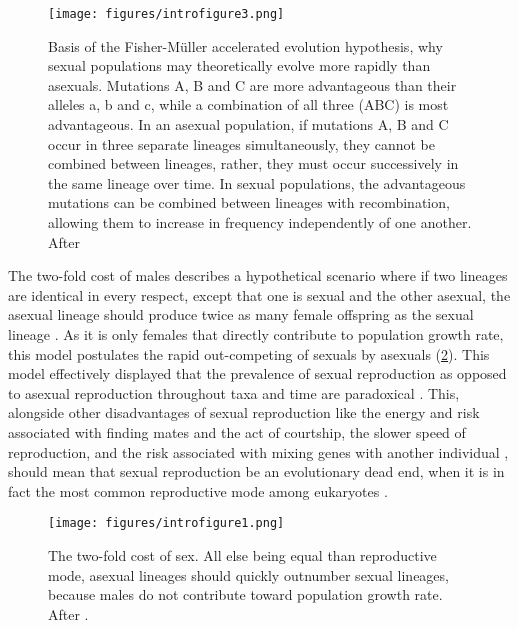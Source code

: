 \begin{figure}
\centering
{}
{\texttt{[image: figures/introfigure3.png]}}
\caption[Basis of the Fisher-M\"uller accelerated evolution hypothesis]{Basis of the Fisher-M\"uller accelerated evolution hypothesis, why sexual populations may theoretically evolve more rapidly than asexuals. Mutations A, B and C are more advantageous than their alleles a, b and c, while a combination of all three (ABC) is most advantageous. In an asexual population, if mutations A, B and C occur in three separate lineages simultaneously, they cannot be combined between lineages, rather, they must occur successively in the same lineage over time. In sexual populations, the advantageous mutations can be combined between lineages with recombination, allowing them to increase in frequency independently of one another. After \textcite{maynard-smith_evolutionary_1989}}
\label{fig:introfigure3}
\end{figure}

The two-fold cost of males describes a hypothetical scenario where if two lineages are identical in every respect, except that one is sexual and the other asexual, the asexual lineage should produce twice as many female offspring as the sexual lineage \parencite{maynard-smith_origin_1971}. As it is only females that directly contribute to population growth rate, this model postulates the rapid out-competing of sexuals by asexuals (\cref{fig:introfigure1}). This model effectively displayed that the prevalence of sexual reproduction as opposed to asexual reproduction throughout taxa and time are paradoxical \parencite{williams_sex_1975}. This, alongside other disadvantages of sexual reproduction like the energy and risk associated with finding mates and the act of courtship, the slower speed of reproduction, and the risk associated with mixing genes with another individual \parencite{otto_resolving_2002}, should mean that sexual reproduction be an evolutionary dead end, when it is in fact the most common reproductive mode among eukaryotes \parencite{bell_masterpiece_1982}.

\begin{figure}
\centering
{}
{\texttt{[image: figures/introfigure1.png]}}
\caption[The two-fold cost of sex]{The two-fold cost of sex. All else being equal than reproductive mode, asexual lineages should quickly outnumber sexual lineages, because males do not contribute toward population growth rate. After \textcite{maynard-smith_origin_1971}.}
\label{fig:introfigure1}
\end{figure}

